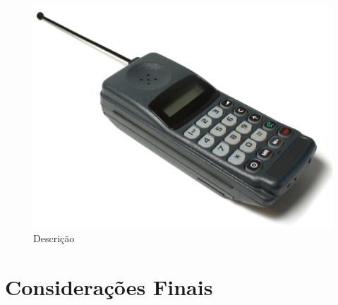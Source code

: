 \documentclass{wticifes}
\begin{document}
\lipsum[3]

\begin{figure}
    \centering
    \includegraphics[width=0.5\linewidth]{img/img.jpg}
    \caption{Descrição}
    \label{fig:enter-label}
\end{figure}

\section{Considerações Finais}
\lipsum[2]

\end{document}
